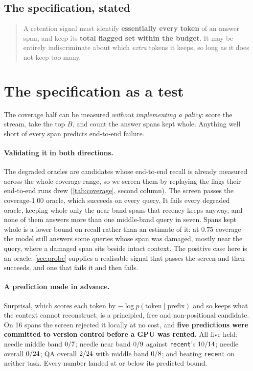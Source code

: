 \documentclass[10pt]{article}
\begin{document}


\subsection{The specification, stated}
\begin{quote}
A retention signal must identify \textbf{essentially every token} of an answer
span, and keep its \textbf{total flagged set within the budget}. It may be
entirely indiscriminate about which \emph{extra} tokens it keeps, so long as it
does not keep too many.
\end{quote}

\section{The specification as a test}\label{sec:test}

The coverage half can be measured \emph{without implementing a policy}: score
the stream, take the top $B$, and count the answer spans kept whole. Anything
well short of every span predicts end-to-end failure.

\paragraph{Validating it in both directions.} The degraded oracles are
candidates whose end-to-end recall is already measured across the whole
coverage range, so we screen them by replaying the flags their end-to-end runs
drew (\cref{tab:coverage}, second column). The screen passes the
coverage-1.00 oracle, which succeeds on every query. It fails every degraded
oracle, keeping whole only the near-band spans that recency keeps anyway, and
none of them answers more than one middle-band query in seven. Spans kept whole
is a lower bound on recall rather than an estimate of it: at 0.75 coverage the
model still answers some queries whose span was damaged, mostly near the query,
where a damaged span sits beside intact context. The positive case here is an
oracle; \cref{sec:probe} supplies a realisable signal that passes the screen and
then succeeds, and one that fails it and then fails.

\paragraph{A prediction made in advance.} Surprisal, which scores each token by
$-\log p(\text{token}\mid\text{prefix})$ and so keeps what the context cannot
reconstruct, is a principled, free and non-positional candidate. On 16 spans
the screen rejected it locally at no cost, and \textbf{five predictions were
committed to version control before a GPU was rented.} All five held: needle
middle band $0/7$; needle near band $0/9$ against
\texttt{recent}'s $10/14$; needle overall $0/24$; QA
overall $2/24$ with middle band $0/8$; and beating
\texttt{recent} on neither task. Every number landed at or below its predicted
bound.
\end{document}
